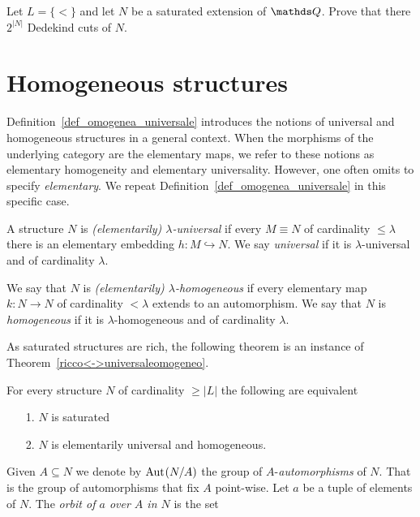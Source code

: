 \begin{exercise}
  Let $L = \{<\}$ and let $N$ be a saturated extension of $\QQ$.
  Prove that there $2^{|N|}$ Dedekind cuts of $N$.
\end{exercise}

\section{Homogeneous structures}\label{homogeneous}
Definition~\ref{def_omogenea_universale} introduces the notions of universal and homogeneous structures in a general context.
When the morphisms of the underlying category are the elementary maps, we refer to these notions as elementary homogeneity and elementary universality.
However, one often omits to specify \textit{elementary}. We repeat Definition~\ref{def_omogenea_universale} in this specific case. 

\begin{definition}
A structure $N$ is \emph{(elementarily) $\lambda$-universal\/} if every $M\equiv N$ of cardinality $\le\lambda$ there is an elementary embedding $h:M\hookrightarrow N$.
We say  \emph{universal\/}  if it is $\lambda$-universal and of cardinality $\lambda$.

We say that $N$ is \emph{(elementarily) $\lambda$-homogeneous\/} if every elementary map $k:N\to N$ of cardinality $<\lambda$ extends to an automorphism. We say that $N$ is \emph{homogeneous\/} if it is $\lambda$-homogeneous and of cardinality $\lambda$.
\end{definition}

As saturated structures are rich, the following theorem is an instance of Theorem~\ref{ricco<->universaleomogeneo}.

\begin{theorem}\label{thm_saturo_omogeneouniversale}
For every structure $N$ of cardinality $\ge|L|$ the following are equivalent\nobreak
\begin{itemize}
\item[1.] $N$ is saturated
\item[2.] $N$ is elementarily universal and homogeneous.
\end{itemize}
\end{theorem}

Given $A\subseteq N$ we denote by \emph{${\rm Aut\kern.15ex}(N/A)$\/} the group of \emph{$A\mbox{-}$automorphisms\/} of $N$. That is the group of automorphisms that fix $A$ point-wise.
Let $a$ be a tuple of elements of $N$. The \emph{orbit of $a$ over $A$ in $N$} is the set

